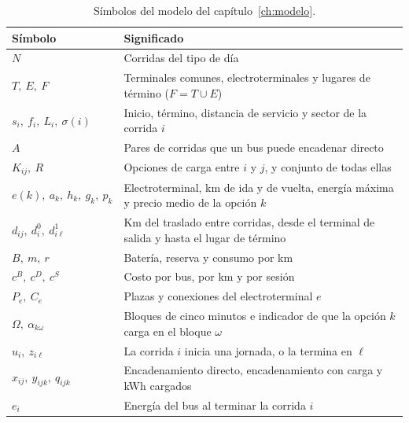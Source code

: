 \begin{table}[H]
\centering
\caption{Símbolos del modelo del capítulo~\ref{ch:modelo}.}
\label{tab:simbolos}
\small
\begin{tabularx}{\textwidth}{@{}l X@{}}
\toprule
Símbolo & Significado \\
\midrule
\(N\) & Corridas del tipo de día \\
\(T,\ E,\ F\) & Terminales comunes, electroterminales y lugares de término (\(F=T\cup E\)) \\
\(s_i,\ f_i,\ L_i,\ \sigma(i)\) & Inicio, término, distancia de servicio y sector de la corrida \(i\) \\
\(A\) & Pares de corridas que un bus puede encadenar directo \\
\(K_{ij},\ R\) & Opciones de carga entre \(i\) y \(j\), y conjunto de todas ellas \\
\(e(k),\ a_k,\ h_k,\ g_k,\ p_k\) & Electroterminal, km de ida y de vuelta, energía máxima y precio medio de la opción \(k\) \\
\(d_{ij},\ d^{0}_i,\ d^{1}_{i\ell}\) & Km del traslado entre corridas, desde el terminal de salida y hasta el lugar de término \\
\(B,\ m,\ r\) & Batería, reserva y consumo por km \\
\(c^{B},\ c^{D},\ c^{S}\) & Costo por bus, por km y por sesión \\
\(P_e,\ C_e\) & Plazas y conexiones del electroterminal \(e\) \\
\(\Omega,\ \alpha_{k\omega}\) & Bloques de cinco minutos e indicador de que la opción \(k\) carga en el bloque \(\omega\) \\
\(u_i,\ z_{i\ell}\) & La corrida \(i\) inicia una jornada, o la termina en \(\ell\) \\
\(x_{ij},\ y_{ijk},\ q_{ijk}\) & Encadenamiento directo, encadenamiento con carga y kWh cargados \\
\(e_i\) & Energía del bus al terminar la corrida \(i\) \\
\bottomrule
\end{tabularx}
\end{table}

